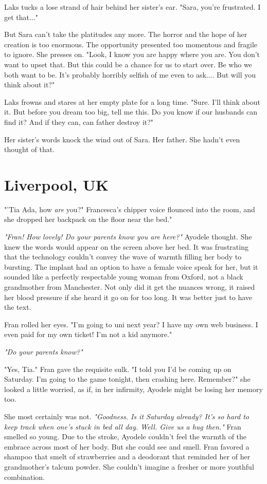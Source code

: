 \documentclass{article}
\begin{document}
Laks tucks a lose strand of hair behind her sister's ear. "Sara, you’re frustrated. I get that..."

But Sara can't take the platitudes any more. The horror and the hope of her creation is too enormous. The opportunity presented too momentous and fragile to ignore. She presses on. "Look, I know you are happy where you are. You don't want to upset that. But this could be a chance for us to start over. Be who we both want to be. It's probably horribly selfish of me even to ask.... But will you think about it?"

Laks frowns and stares at her empty plate for a long time. "Sure. I'll think about it. But before you dream too big, tell me this. Do you know if our husbands can find it? And if they can, can father destroy it?"

Her sister's words knock the wind out of Sara. Her father. She hadn't even thought of that.


\section{Liverpool, UK}

"'Tia Ada, how \emph{are} you?" Francesca's chipper voice flounced into the room, and she dropped her backpack on the floor near the bed."

\emph{"Fran! How lovely! Do your parents know you are here?"} Ayodele thought. She knew the words would appear on the screen above her bed. It was frustrating that the technology couldn't convey the wave of warmth filling her body to bursting. The implant had an option to have a female voice speak for her, but it sounded like a perfectly respectable young woman from Oxford, not a black grandmother from Manchester. Not only did it get the nuances wrong, it raised her blood pressure if she heard it go on for too long. It was better just to have the text.

Fran rolled her eyes. "I'm going to uni next year? I have my own web business. I even paid for my own ticket! I'm not a kid anymore."

\emph{"Do your parents know?"}

"Yes, Tia." Fran gave the requisite sulk. "I told you I'd be coming up on Saturday. I'm going to the game tonight, then crashing here. Remember?" she looked a little worried, as if, in her infirmity, Ayodele might be losing her memory too.

She most certainly was not. \emph{"Goodness. Is it Saturday already? It’s so hard to keep track when one's stuck in bed all day. Well. Give us a hug then."} Fran smelled so young. Due to the stroke, Ayodele couldn't feel the warmth of the embrace across most of her body. But she could see and smell. Fran favored a shampoo that smelt of strawberries and a deodorant that reminded her of her grandmother's talcum powder. She couldn't imagine a fresher or more youthful combination. 
\end{document}
